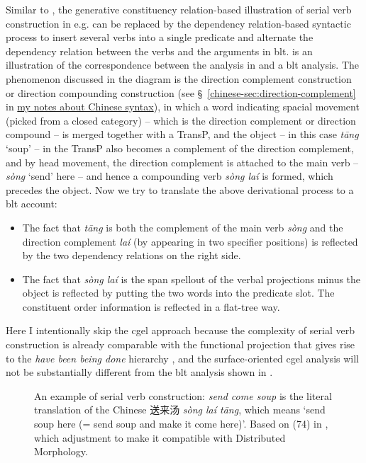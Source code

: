 \documentclass[UTF8, a4paper, oneside, scheme=plain]{ctexart}
\newcommand*{\citesec}[1]{\S~{#1}}
\newcommand*{\corpus}[1]{\emph{#1}}
\newcommand{\chinesenote}{\href{../Chinese/main.pdf}{my notes about Chinese syntax}}
\begin{document}
Similar to , 
the generative constituency relation-based illustration 
of serial verb construction in e.g. \citet{chen2016mandarin}
can be replaced by the dependency relation-based syntactic process to insert several verbs into a single predicate 
and alternate the dependency relation between the verbs and the arguments in \ac{blt}.
 is an illustration of 
the correspondence between the analysis in \citet{chen2016mandarin} and a \ac{blt} analysis.
The phenomenon discussed in the diagram is the direction complement construction
or direction compounding construction 
(see \citesec{\ref{chinese-sec:direction-complement}} in \chinesenote),
in which a word indicating spacial movement (picked from a closed category) 
-- which is the direction complement or direction compound -- 
is merged together with a TransP,
and the object -- in this case \corpus{t\={a}ng} `soup' -- in the TransP
also becomes a complement of the direction complement,
and by head movement, the direction complement is attached to the main verb 
-- \corpus{s\`{o}ng} `send' here -- 
and hence a compounding verb \corpus{s\`{o}ng la\'{i}} is formed,
which precedes the object.
Now we try to translate the above derivational process to a \ac{blt} account:
\begin{itemize}
    \item The fact that \corpus{t\={a}ng} is both 
    the complement of the main verb \corpus{s\`{o}ng}
    and the direction complement \corpus{la\'{i}} 
    (by appearing in two specifier positions)
    is reflected by the two dependency relations 
    on the right side.
    \item The fact that \corpus{s\`{o}ng la\'{i}} is the span spellout of the verbal projections minus the object 
    is reflected by putting the two words into the predicate slot.
    The constituent order information is reflected in a flat-tree way.
\end{itemize}
Here I intentionally skip the \ac{cgel} approach 
because the complexity of serial verb construction
is already comparable with the functional projection 
that gives rise to the \corpus{have been being done} hierarchy
\citep{ramchand2014deriving},
and the surface-oriented \ac{cgel} analysis will not be substantially different 
from the \ac{blt} analysis shown in .

\begin{figure}
    \centering
    
    \caption{An example of serial verb construction: 
    \corpus{send come soup} is the literal translation of the Chinese 送来汤 \corpus{s\`{o}ng la\'{i} t\={a}ng},
    which means `send soup here (= send soup and make it come here)'.
    Based on (74) in \citet{chen2016mandarin},
    which adjustment to make it compatible with Distributed Morphology.}
    \label{fig:serial-verb-construction-1}
\end{figure}
\end{document}
